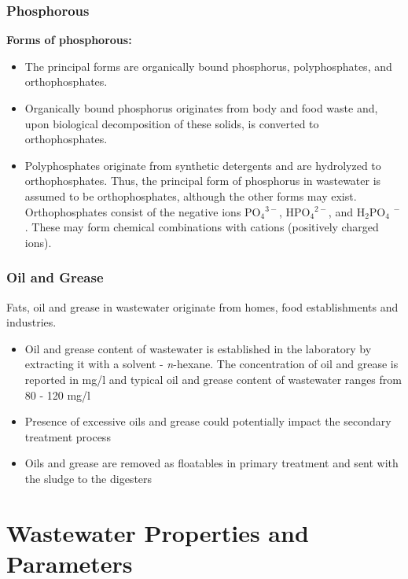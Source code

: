 		\subsubsection{Phosphorous}			
		\textbf{Forms of phosphorous:}\\
					      \begin{itemize}
					      	\item The principal forms are organically bound phosphorus, polyphosphates, and orthophosphates.
					      	\item Organically bound phosphorus originates from body and food waste and, upon biological decomposition of these solids, is converted to orthophosphates. 
					      	\item Polyphosphates originate from synthetic detergents and are hydrolyzed to orthophosphates. Thus, the principal form of phosphorus in wastewater is assumed to be orthophosphates, although the other forms may exist. Orthophosphates consist of the negative ions PO$_4$$^{3-}$, HPO$_4$$^{2-}$, and H$_2$PO$_4$ $^-$.  These may form chemical combinations with cations (positively charged ions).
					      \end{itemize}

\subsubsection{Oil and Grease}	
			Fats, oil and grease in wastewater originate from homes, food establishments and industries.
			\begin{itemize}
				\item Oil and grease content of wastewater is established in the laboratory by extracting it with a solvent - \textit{n}-hexane.  The concentration of oil and grease is reported in mg/l and typical oil and grease content of wastewater ranges from 80 - 120 mg/l
				\item Presence of excessive oils and grease could potentially impact the secondary treatment process
				\item Oils and grease are removed as floatables in primary treatment and sent with the sludge to the digesters
			\end{itemize}

\section{Wastewater Properties and Parameters} 
			
